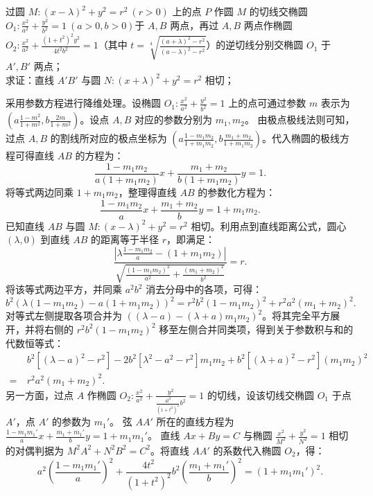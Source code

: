 \begin{exercise}
过圆 \(M: (x - \lambda)^2 + y^2 = r^2\ (r > 0)\) 上的点 \(P\) 作圆 \(M\) 的切线交椭圆$O_1: \frac{x^2}{a^2} + \frac{y^2}{b^2} = 1\ (a > 0, b > 0)$于 \(A,B\) 两点，再过 \(A,B\) 两点作椭圆$O_2: \frac{x^2}{a^2} + \frac{(1 + t^2)^2 y^2}{4 t^2 b^2} = 1$（其中 \(t = \sqrt[4]{\frac{(a + \lambda)^2 - r^2}{(a - \lambda)^2 - r^2}}\)）的逆切线分别交椭圆 \(O_1\) 于 \(A',B'\) 两点；\\
求证：直线 \(A'B'\) 与圆 \(N: (x + \lambda)^2 + y^2 = r^2\) 相切；
\end{exercise}
\begin{solution}
采用参数方程进行降维处理。设椭圆 $O_1: \frac{x^2}{a^2} + \frac{y^2}{b^2} = 1$ 上的点可通过参数 $m$ 表示为 $\left( a\frac{1-m^2}{1+m^2}, b\frac{2m}{1+m^2} \right)$。设点 $A, B$ 对应的参数分别为 $m_1, m_2$。
由极点极线法则可知，过点 $A, B$ 的割线所对应的极点坐标为 $\left(a\frac{1-m_1m_2}{1+m_1m_2}, b\frac{m_1+m_2}{1+m_1m_2}\right)$。代入椭圆的极线方程可得直线 $AB$ 的方程为：
\[ \frac{1-m_1m_2}{a(1+m_1m_2)}x + \frac{m_1+m_2}{b(1+m_1m_2)}y = 1. \]
将等式两边同乘 $1+m_1m_2$，整理得直线 $AB$ 的参数化方程为：
\[ \frac{1-m_1m_2}{a}x + \frac{m_1+m_2}{b}y = 1+m_1m_2. \]
已知直线 $AB$ 与圆 $M: (x-\lambda)^2 + y^2 = r^2$ 相切。利用点到直线距离公式，圆心 $(\lambda, 0)$ 到直线 $AB$ 的距离等于半径 $r$，即满足：
\[ \frac{\left| \lambda\frac{1-m_1m_2}{a} - (1+m_1m_2) \right|}{\sqrt{\frac{(1-m_1m_2)^2}{a^2} + \frac{(m_1+m_2)^2}{b^2}}} = r. \]
将该等式两边平方，并同乘 $a^2b^2$ 消去分母中的各项，可得：
\[ b^2(\lambda(1-m_1m_2) - a(1+m_1m_2))^2 = r^2b^2(1-m_1m_2)^2 + r^2 a^2 (m_1+m_2)^2. \]
对等式左侧提取各项合并为 $((\lambda-a) - (\lambda+a)m_1m_2)^2$。将其完全平方展开，并将右侧的 $r^2b^2(1-m_1m_2)^2$ 移至左侧合并同类项，得到关于参数积与和的代数恒等式：
\begin{align*}
    & b^2[(\lambda-a)^2 - r^2] - 2b^2[\lambda^2-a^2-r^2]m_1m_2 + b^2[(\lambda+a)^2 - r^2](m_1m_2)^2 \\
    =\ & r^2 a^2 (m_1+m_2)^2.
\end{align*}
另一方面，过点 $A$ 作椭圆 $O_2: \frac{x^2}{a^2} + \frac{y^2}{\frac{4t^2}{(1+t^2)^2}b^2} = 1$ 的切线，设该切线交椭圆 $O_1$ 于点 $A'$，点 $A'$ 的参数为 $m_1'$。
弦 $AA'$ 所在的直线方程为 $\frac{1-m_1m_1'}{a}x + \frac{m_1+m_1'}{b}y = 1+m_1m_1'$。
直线 $Ax + By = C$ 与椭圆 $\frac{x^2}{M^2} + \frac{y^2}{N^2} = 1$ 相切的对偶判据为 $M^2 A^2 + N^2 B^2 = C^2$。将直线 $AA'$ 的系数代入椭圆 $O_2$，得：
\[ a^2 \left(\frac{1-m_1m_1'}{a}\right)^2 + \frac{4t^2}{(1+t^2)^2}b^2 \left(\frac{m_1+m_1'}{b}\right)^2 = (1+m_1m_1')^2. \]

\end{solution}

